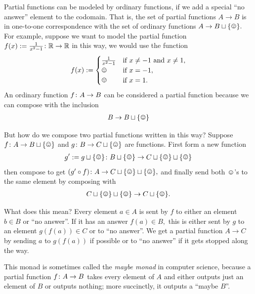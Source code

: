 \documentclass[CT4S-EN-RU]{subfiles}
\begin{document}
\begin{blockRUS}
\end{blockRUS}

\begin{exampleENG}\label{ex:partial function monad}
Partial functions can be modeled by ordinary functions, if we add a special “no answer” element to the codomain. That is, the set of partial functions $A\to B$ is in one-to-one correspondence with the set of ordinary functions $A\to B\sqcup\singleton.$ For example, suppose we want to model the partial function $f(x):=\frac{1}{x^2-1}\colon{\mathbb R}\rightarrow{\mathbb R}$ in this way, we would use the function 
$$f(x):=\begin{cases}
\frac{1}{x^2-1}&\tn{if } x\neq -1 \tn{ and } x\neq 1,\\
\smiley&\tn{if } x=-1,\\
\smiley&\tn{if } x= 1.
\end{cases}
$$
An ordinary function $f\colon A\rightarrow B$ can be considered a partial function because we can compose with the inclusion 
\begin{align}\label{dia:first eta}
B\to B\sqcup\singleton
\end{align}

But how do we compose two partial functions written in this way? Suppose $f\taking A\to B\sqcup\singleton$ and $g\taking B\to C\sqcup\singleton$ are functions. First form a new function 
\begin{align}\label{dia:first monad}
g':=g\sqcup\singleton\taking B\sqcup\singleton\to C\sqcup\singleton\sqcup\singleton
\end{align}
then compose to get $(g'\circ f)\taking A\to C\sqcup\singleton\sqcup\singleton,$ and finally send both $\smiley$'s to the same element by composing with 
\begin{align}\label{dia:first mu}
C\sqcup\singleton\sqcup\singleton\to C\sqcup\singleton.
\end{align}

What does this mean? Every element $a\in A$ is sent by $f$ to either an element $b\in B$ or “no answer”. If it has an answer $f(a)\in B,$ this is either sent by $g$ to an element $g(f(a))\in C$ or to “no answer”. We get a partial function $A\to C$ by sending $a$ to $g(f(a))$ if possible or to “no answer” if it gets stopped along the way.

This monad is sometimes called the {\em maybe monad} in computer science, because a partial function $f\colon A\rightarrow B$ takes every element of $A$ and either outputs just an element of $B$ or outputs nothing; more succinctly, it outputs a “maybe $B$”.
\end{exampleENG}
\end{document}
